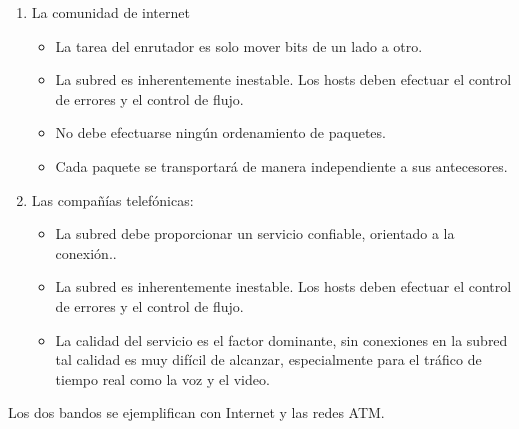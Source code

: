 \documentclass[10pt,a4paper]{report}
\begin{document}
	\begin{enumerate}
		\item La comunidad de internet
		\begin{itemize}\itemsep=0pt
			\item La tarea del enrutador es solo mover bits de un lado a otro.
			\item La subred es inherentemente inestable. Los hosts deben efectuar el 
			control de errores y el control de flujo.
			\item No debe efectuarse ningún ordenamiento de paquetes.
			\item Cada paquete se transportará de manera independiente a sus 
			antecesores.
			\end{itemize}
		\item Las compañías telefónicas:
		\begin{itemize}\itemsep=0pt
			\item La subred debe proporcionar un servicio confiable, orientado a la
conexión..
			\item La subred es inherentemente inestable. Los hosts deben efectuar el 
			control de errores y el control de flujo.
			\item La calidad del servicio es el factor dominante, sin conexiones en la 
			subred tal calidad es muy difícil de alcanzar, especialmente para el tráfico de 
			tiempo real como la voz y el video.
		\end{itemize}
	\end{enumerate}
\par Los dos bandos se ejemplifican con Internet y las redes ATM.
\end{document}
